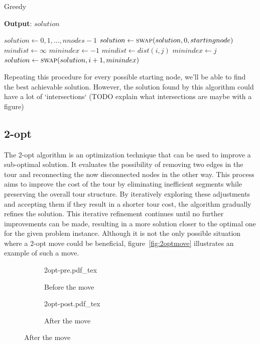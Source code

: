 \documentclass{article}
\begin{document}
\begin{algorithm}[h]
\caption{Greedy}
\label{alg:greedy}
\hspace*{0.5em} \textbf{Output}: $solution$
\begin{algorithmic}

	\State $solution \gets {0, 1, \dots, nnodes - 1}$
	\State $solution \gets \Call{swap}{solution, 0, startingnode}$
		\State $mindist \gets \infty$
		\State $minindex \gets -1$
				\State $mindist \gets dist(i, j)$
				\State $minindex \gets j$
			\EndIf
		\EndFor
		\State $solution \gets \Call{swap}{solution, i + 1, minindex}$
    \EndFor

  \EndProcedure

\end{algorithmic}
\end{algorithm}
Repeating this procedure for every possible starting node, we'll be able to find the best
achievable solution.
However, the solution found by this algorithm could have a lot of `intersections`
(TODO explain what intersections are maybe with a figure)

\subsection{2-opt}
The 2-opt algorithm is an optimization technique that can be used to improve a sub-optimal solution.
It evaluates the possibility of removing two edges in the tour and reconnecting the now disconnected nodes in the other way.
This process aims to improve the cost of the tour by eliminating inefficient segments while preserving the overall tour structure. By
iteratively exploring these adjustments and accepting them if they result in a shorter tour cost, the algorithm gradually refines
the solution. This iterative refinement continues until no further improvements can be made, resulting in a more
solution closer to the optimal one for the given problem instance.
Although it is not the only possible situation where a 2-opt move could be
beneficial, figure~\ref{fig:2optmove} illustrates an example of such a move.

\begin{figure}[H]
        \caption{Example of a 2-opt move}
        \label{fig:2optmove}
        \centering
        \begin{subfigure}{.5\textwidth}
                \centering
                \def\svgwidth{.7\linewidth}
                {2opt-pre.pdf_tex}
                \caption{Before the move}
        \end{subfigure}%
        \begin{subfigure}{.5\textwidth}
                \centering
                \def\svgwidth{.7\linewidth}
                {2opt-post.pdf_tex}
                \caption{After the move}
        \end{subfigure}
\end{figure}
\end{document}
